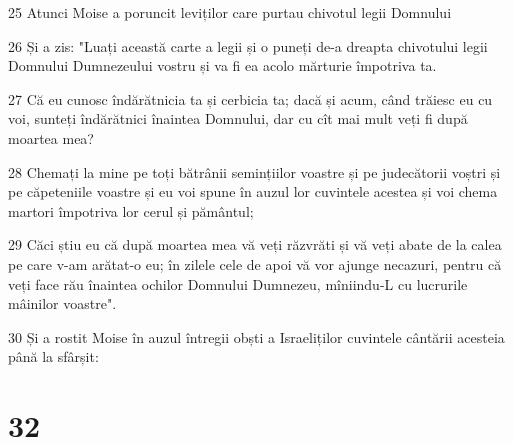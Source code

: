 \par 25 Atunci Moise a poruncit leviților care purtau chivotul legii Domnului
\par 26 Și a zis: "Luați această carte a legii și o puneți de-a dreapta chivotului legii Domnului Dumnezeului vostru și va fi ea acolo mărturie împotriva ta.
\par 27 Că eu cunosc îndărătnicia ta și cerbicia ta; dacă și acum, când trăiesc eu cu voi, sunteți îndărătnici înaintea Domnului, dar cu cît mai mult veți fi după moartea mea?
\par 28 Chemați la mine pe toți bătrânii semințiilor voastre și pe judecătorii voștri și pe căpeteniile voastre și eu voi spune în auzul lor cuvintele acestea și voi chema martori împotriva lor cerul și pământul;
\par 29 Căci știu eu că după moartea mea vă veți răzvrăti și vă veți abate de la calea pe care v-am arătat-o eu; în zilele cele de apoi vă vor ajunge necazuri, pentru că veți face rău înaintea ochilor Domnului Dumnezeu, mîniindu-L cu lucrurile mâinilor voastre".
\par 30 Și a rostit Moise în auzul întregii obști a Israeliților cuvintele cântării acesteia până la sfârșit:

\chapter{32}

